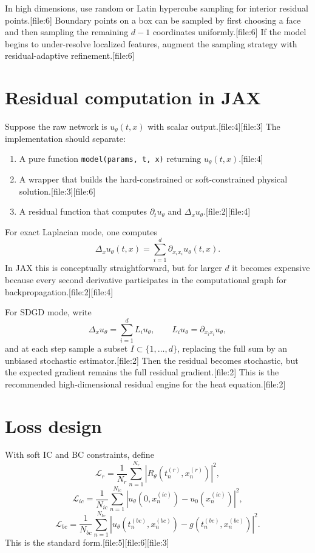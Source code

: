 \documentclass[11pt]{report}
\begin{document}
In high dimensions, use random or Latin hypercube sampling for interior residual points.[file:6]  
Boundary points on a box can be sampled by first choosing a face and then sampling the remaining \(d-1\) coordinates uniformly.[file:6]  
If the model begins to under-resolve localized features, augment the sampling strategy with residual-adaptive refinement.[file:6]

\section{Residual computation in JAX}

Suppose the raw network is \(u_\theta(t,x)\) with scalar output.[file:4][file:3]  
The implementation should separate:
\begin{enumerate}[label=\arabic*.]
\item A pure function \texttt{model(params, t, x)} returning \(u_\theta(t,x)\).[file:4]
\item A wrapper that builds the hard-constrained or soft-constrained physical solution.[file:3][file:6]
\item A residual function that computes \(\partial_t u_\theta\) and \(\Delta_x u_\theta\).[file:2][file:4]
\end{enumerate}

For exact Laplacian mode, one computes
\[
\Delta_x u_\theta(t,x)=\sum_{i=1}^d \partial_{x_i x_i}u_\theta(t,x).
\]
In JAX this is conceptually straightforward, but for larger \(d\) it becomes expensive because every second derivative participates in the computational graph for backpropagation.[file:2][file:4]

For SDGD mode, write
\[
\Delta_x u_\theta = \sum_{i=1}^d L_i u_\theta,
\qquad
L_i u_\theta = \partial_{x_i x_i}u_\theta,
\]
and at each step sample a subset \(I\subset\{1,\dots,d\}\), replacing the full sum by an unbiased stochastic estimator.[file:2]  
Then the residual becomes stochastic, but the expected gradient remains the full residual gradient.[file:2]  
This is the recommended high-dimensional residual engine for the heat equation.[file:2]

\section{Loss design}

With soft IC and BC constraints, define
\[
\mathcal{L}_r
=
\frac{1}{N_r}\sum_{n=1}^{N_r} |R_\theta(t_n^{(r)},x_n^{(r)})|^2,
\]
\[
\mathcal{L}_{ic}
=
\frac{1}{N_{ic}}\sum_{n=1}^{N_{ic}}
|u_\theta(0,x_n^{(ic)})-u_0(x_n^{(ic)})|^2,
\]
\[
\mathcal{L}_{bc}
=
\frac{1}{N_{bc}}\sum_{n=1}^{N_{bc}}
|u_\theta(t_n^{(bc)},x_n^{(bc)})-g(t_n^{(bc)},x_n^{(bc)})|^2.
\]
This is the standard form.[file:5][file:6][file:3]
\end{document}
